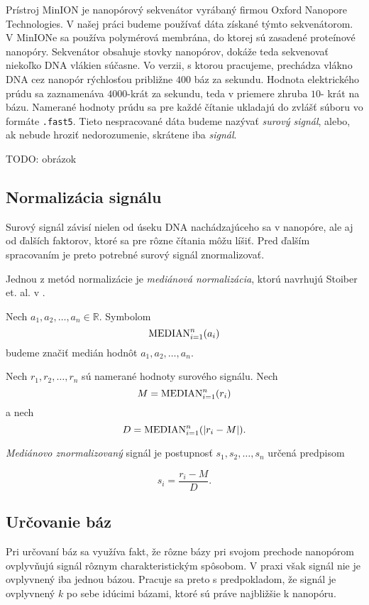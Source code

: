 Prístroj MinION je nanopórový sekvenátor vyrábaný firmou Oxford Nanopore Technologies. V našej práci 
budeme používať dáta získané týmto sekvenátorom. V MinIONe sa používa polymérová membrána, do ktorej sú 
zasadené proteínové nanopóry. Sekvenátor obsahuje stovky nanopórov, dokáže teda sekvenovať niekoľko DNA 
vlákien súčasne.
Vo verzii, s ktorou pracujeme, prechádza vlákno DNA cez nanopór rýchlosťou približne $400$ báz za 
sekundu. Hodnota elektrického prúdu sa zaznamenáva $4000$-krát za sekundu, teda v priemere zhruba $10$-
krát na bázu. Namerané hodnoty prúdu sa pre každé čítanie ukladajú do zvlášť súboru vo formáte 
\texttt{.fast5}. Tieto nespracované dáta budeme nazývať \emph{surový signál}, alebo, ak nebude hroziť 
nedorozumenie, skrátene iba \emph{signál}.

TODO: obrázok

\subsection{Normalizácia signálu}

Surový signál závisí nielen od úseku DNA nachádzajúceho sa v nanopóre, ale aj od ďalších faktorov, ktoré 
sa pre rôzne čítania môžu líšiť. Pred ďalším spracovaním je preto potrebné surový signál znormalizovať.

Jednou z metód normalizácie je \emph{mediánová normalizácia}, ktorú navrhujú Stoiber et. al. v \cite{Stoiber2017}.

\begin{definicia}
Nech $a_1, a_2, \dots, a_n \in \mathbb{R}$. Symbolom
$$\median{i=1}{n}(a_i)$$
budeme značiť medián hodnôt $a_1, a_2, \dots, a_n$.
\end{definicia}

\begin{definicia}
Nech $r_1, r_2, \dots, r_n$ sú namerané hodnoty surového signálu. Nech
 $$M = \median{i=1}{n}(r_i)$$ a nech $$D = \median{i=1}{n}(\abs*{r_i - M}) \text{.}$$

\emph{Mediánovo znormalizovaný} signál je postupnosť $s_1, s_2, \dots, s_n$ určená predpisom

$$s_i = \frac{r_i - M}{D} \text{.}$$

\end{definicia}

\subsection{Určovanie báz}

Pri určovaní báz sa využíva fakt, že rôzne bázy pri svojom prechode nanopórom ovplyvňujú signál
rôznym charakteristickým spôsobom. V praxi však signál nie je ovplyvnený iba jednou bázou. Pracuje
sa preto s predpokladom, že signál je ovplyvnený $k$ po sebe idúcimi bázami, ktoré sú práve najbližšie
k nanopóru.